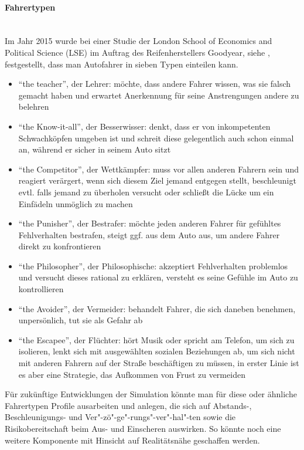 \paragraph*{Fahrertypen}
\hfill \\
Im Jahr 2015 wurde bei einer Studie der London School of Economics and Political Science (LSE) im Auftrag des Reifenherstellers Goodyear, siehe \cite{fahrertyp}, festgestellt, dass man Autofahrer in sieben Typen einteilen kann.
\begin{itemize}
\itemsep0em
	\item \enquote{the teacher}, der Lehrer: möchte, dass andere Fahrer wissen, was sie falsch gemacht haben und erwartet Anerkennung für seine Anstrengungen andere zu belehren
	\item \enquote{the Know-it-all}, der Besserwisser: denkt, dass er von inkompetenten Schwachköpfen umgeben ist und schreit diese gelegentlich auch schon einmal an, während er sicher in seinem Auto sitzt
	\item \enquote{the Competitor}, der Wettkämpfer: muss vor allen anderen Fahrern sein und reagiert verärgert, wenn sich diesem Ziel jemand entgegen stellt, beschleunigt evtl. falls jemand zu überholen versucht oder schließt die Lücke um ein Einfädeln unmöglich zu machen
	\item \enquote{the Punisher}, der Bestrafer: möchte jeden anderen Fahrer für gefühltes Fehlverhalten bestrafen, steigt ggf. aus dem Auto aus, um andere Fahrer direkt zu konfrontieren
	\item \enquote{the Philosopher}, der Philosophische: akzeptiert Fehlverhalten problemlos und versucht dieses rational zu erklären, versteht es seine Gefühle im Auto zu kontrollieren
	\item \enquote{the Avoider}, der Vermeider: behandelt Fahrer, die sich daneben benehmen, unpersönlich, tut sie als Gefahr ab
	\item \enquote{the Escapee}, der Flüchter: hört Musik oder spricht am Telefon, um sich zu isolieren, lenkt sich mit ausgewählten sozialen Beziehungen ab, um sich nicht mit anderen Fahrern auf der Straße beschäftigen zu müssen, in erster Linie ist es aber eine Strategie, das Aufkommen von Frust zu vermeiden
\end{itemize}

Für zukünftige Entwicklungen der Simulation könnte man für diese oder ähnliche Fahrertypen Profile ausarbeiten und anlegen, die sich auf Abstands-, Beschleunigungs- und Ver"-zö"-ge"-rungs"-ver"-hal"-ten sowie die Risikobereitschaft beim Aus- und Einscheren auswirken.
So könnte noch eine weitere Komponente mit Hinsicht auf Realitätsnähe geschaffen werden. 

